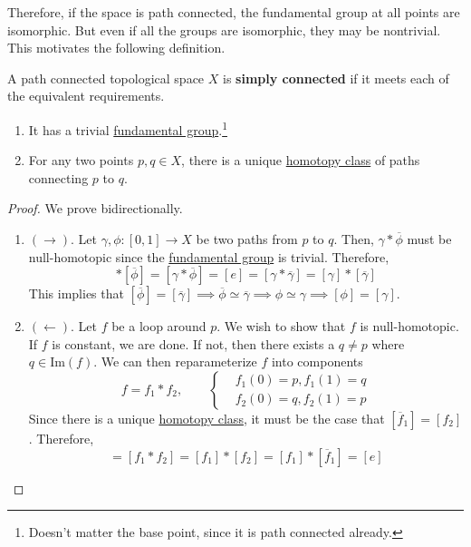   Therefore, if the space is path connected, the fundamental group at all points are isomorphic. But even if all the groups are isomorphic, they may be nontrivial. This motivates the following definition. 

	\begin{definition}
	  \label{def:simply-connected}
		A path connected topological space $X$ is \textbf{simply connected} if it meets each of the equivalent requirements. 
		\begin{enumerate}
			\item It has a trivial \hyperref[def:fundamental-group]{fundamental group}.\footnote{Doesn't matter the base point, since it is path connected already.}
			\item For any two points $p, q \in X$, there is a unique \hyperref[def:homotopy-class]{homotopy class} of paths connecting $p$ to $q$. 
		\end{enumerate}
  \end{definition}
	\begin{proof}
	  We prove bidirectionally. 
		\begin{enumerate}
			\item $(\rightarrow)$. Let $\gamma, \phi: [0, 1] \to X$ be two paths from $p$ to $q$. Then, $\gamma \ast \overline{\phi}$ must be null-homotopic since the \hyperref[def:fundamental-group]{fundamental group} is trivial. Therefore, 
				\begin{equation}
					[\gamma] \ast [\overline{\phi}] = [\gamma \ast \overline{\phi}] = [e] = [\gamma \ast \overline{\gamma}] = [\gamma] \ast [\overline{\gamma}] 
				\end{equation}
				This implies that $[\overline{\phi}] = [\overline{\gamma}] \implies \overline{\phi} \simeq \overline{\gamma} \implies \phi \simeq \gamma \implies [\phi] = [\gamma]$. 

			\item $(\leftarrow)$. Let $f$ be a loop around $p$. We wish to show that $f$ is null-homotopic. If $f$ is constant, we are done. If not, then there exists a $q \neq p$ where $q \in \mathrm{Im}(f)$. We can then reparameterize $f$ into components 
				\begin{equation}
					f = f_1 \ast f_2, \qquad \begin{cases} 
						& f_1 (0) = p, f_1 (1) = q \\ 
						& f_2 (0) = q, f_2 (1) = p 
					\end{cases}
				\end{equation}
				Since there is a unique \hyperref[def:homotopy-class]{homotopy class}, it must be the case that $[\overline{f}_1] = [f_2]$. Therefore, 
				\begin{equation}
					[f] = [f_1 \ast f_2] = [f_1] \ast [f_2] = [f_1] \ast [\overline{f}_1] = [e]
				\end{equation}
		\end{enumerate}
	\end{proof}


